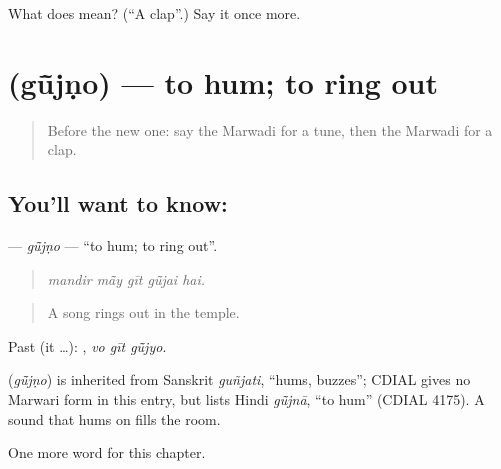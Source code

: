 \begin{tcolorbox}[breakable,colback=teal!4,colframe=teal!35!black,title={Before you move on}]
What does  mean? (\textquotedblleft{}A clap\textquotedblright{}.) Say it once more.
\end{tcolorbox}
\section[\texorpdfstring{\mw{गूंजणो} (gū̃jṇo)}{गूंजणो (gū̃jṇo)}]{ (gū̃jṇo) — to hum; to ring out}

\label{lesson:MW-C276-gujno}



\begin{quote}
Before the new one: say the Marwadi for a tune, then the Marwadi for a clap.
\end{quote}

\subsection*{You'll want to know: }
\textbf{} — \emph{gū̃jṇo} — \textquotedblleft{}to hum; to ring out\textquotedblright{}.

\begin{quote}
    
\end{quote}

\begin{quote}
\emph{mandir mā̃y gīt gū̃jai hai.}
\end{quote}

\begin{quote}
A song rings out in the temple.
\end{quote}

Past (it …):   , \emph{vo gīt gū̃jyo}.

\begin{cousinweb}
\textbf{} (\emph{gū̃jṇo}) is inherited from Sanskrit \emph{guñjati}, \textquotedblleft{}hums, buzzes\textquotedblright{}; CDIAL gives no Marwari form in this entry, but lists Hindi \emph{gū̃jnā}, \textquotedblleft{}to hum\textquotedblright{} (CDIAL 4175). A sound that hums on fills the room.
\end{cousinweb}

\begin{grammarlens}[title={What you've built}]
One more word for this chapter.
\end{grammarlens}

